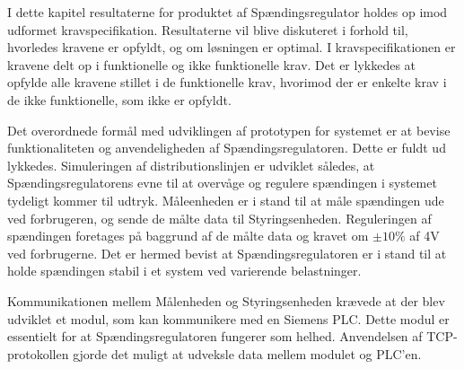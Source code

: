 
I dette kapitel resultaterne for produktet af Spændingsregulator holdes op imod udformet kravspecifikation. Resultaterne vil blive diskuteret i forhold til, hvorledes kravene er opfyldt, og om løsningen er optimal. I kravspecifikationen er kravene delt op i funktionelle og ikke funktionelle krav. Det er lykkedes at opfylde alle kravene stillet i de funktionelle krav, hvorimod der er enkelte krav i de ikke funktionelle, som ikke er opfyldt. 

Det overordnede formål med udviklingen af prototypen for systemet er at bevise funktionaliteten og anvendeligheden af Spændingsregulatoren. Dette er fuldt ud lykkedes. Simuleringen af distributionslinjen er udviklet således, at Spændingsregulatorens evne til at overvåge og regulere spændingen i systemet tydeligt kommer til udtryk. Måleenheden er i stand til at måle spændingen ude ved forbrugeren, og sende de målte data til Styringsenheden. Reguleringen af spændingen foretages på baggrund af de målte data og kravet om $\pm10\%$ af 4V ved forbrugerne. Det er hermed bevist at Spændingsregulatoren er i stand til at holde spændingen stabil i et system ved varierende belastninger. 

Kommunikationen mellem Målenheden og Styringsenheden krævede at der blev udviklet et modul, som kan kommunikere med en Siemens PLC. Dette modul er essentielt for at Spændingsregulatoren fungerer som helhed. Anvendelsen af TCP-protokollen gjorde det muligt at udveksle data mellem modulet og PLC'en. 


